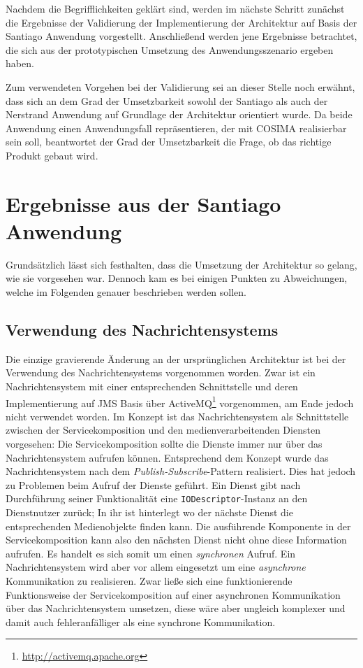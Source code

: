   Nachdem die Begrifflichkeiten geklärt sind, werden im nächste Schritt zunächst die Ergebnisse der Validierung der Implementierung der Architektur auf Basis der Santiago Anwendung vorgestellt. Anschließend werden jene Ergebnisse betrachtet, die sich aus der prototypischen Umsetzung des Anwendungsszenario ergeben haben.
  
  Zum verwendeten Vorgehen bei der Validierung sei an dieser Stelle noch erwähnt, dass sich an dem Grad der Umsetzbarkeit sowohl der Santiago als auch der Nerstrand Anwendung auf Grundlage der Architektur orientiert wurde. Da beide Anwendung einen Anwendungsfall repräsentieren, der mit COSIMA realisierbar sein soll, beantwortet der Grad der Umsetzbarkeit die Frage, ob das richtige Produkt gebaut wird.
  

\section{Ergebnisse aus der Santiago Anwendung} %
\label{sec:ergebnisse_aus_der_santiago_anwendung}

  Grundsätzlich lässt sich festhalten, dass die Umsetzung der Architektur so gelang, wie sie vorgesehen war. Dennoch kam es bei einigen Punkten zu Abweichungen, welche im Folgenden genauer beschrieben werden sollen.
  
\subsection{Verwendung des Nachrichtensystems} %
\label{sub:verwendung_des_nachrichtensystems}

  Die einzige gravierende Änderung an der ursprünglichen Architektur ist bei der Verwendung des Nachrichtensystems vorgenommen worden. Zwar ist ein Nachrichtensystem mit einer entsprechenden Schnittstelle und deren Implementierung auf JMS Basis über \mbox{ActiveMQ}\footnote{\url{http://activemq.apache.org}} vorgenommen, am Ende jedoch nicht verwendet worden. Im Konzept ist das Nachrichtensystem als Schnittstelle zwischen der Servicekomposition und den medienverarbeitenden Diensten vorgesehen: Die Servicekomposition sollte die Dienste immer nur über das Nachrichtensystem aufrufen können. Entsprechend dem Konzept wurde das Nachrichtensystem nach dem \emph{Publish-Subscribe}-Pattern realisiert. Dies hat jedoch zu Problemen beim Aufruf der Dienste geführt. Ein Dienst gibt nach Durchführung seiner Funktionalität eine \verb!IODescriptor!-Instanz an den Dienstnutzer zurück; In ihr ist hinterlegt wo der nächste Dienst die entsprechenden Medienobjekte finden kann. Die ausführende Komponente in der Servicekomposition kann also den nächsten Dienst nicht ohne diese Information aufrufen. Es handelt es sich somit um einen \emph{synchronen} Aufruf. Ein Nachrichtensystem wird aber vor allem eingesetzt um eine \emph{asynchrone} Kommunikation zu realisieren. Zwar ließe sich eine funktionierende Funktionsweise der Servicekomposition auf einer asynchronen Kommunikation über das Nachrichtensystem umsetzen, diese wäre aber ungleich komplexer und damit auch fehleranfälliger als eine synchrone Kommunikation.
  
